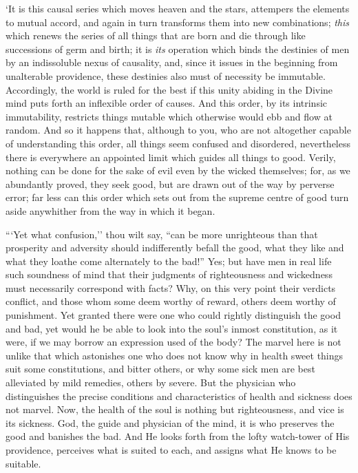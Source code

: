 \documentclass[11pt]{book}
\begin{document}
`It is this causal series which moves heaven and the stars, attempers
the elements to mutual accord, and again in turn transforms them into
new combinations; \emph{this} which renews the series of all things that are
born and die through like successions of germ and birth; it is \emph{its}
operation which binds the destinies of men by an indissoluble nexus of
causality, and, since it issues in the beginning from unalterable
providence, these destinies also must of necessity be immutable.
Accordingly, the world is ruled for the best if this unity abiding in
the Divine mind puts forth an inflexible order of causes. And this
order, by its intrinsic immutability, restricts things mutable which
otherwise would ebb and flow at random. And so it happens that, although
to you, who are not altogether capable of understanding this order, all
things seem confused and disordered, nevertheless there is everywhere an
appointed limit which guides all things to good. Verily, nothing can be
done for the sake of evil even by the wicked themselves; for, as we
abundantly proved, they seek good, but are drawn out of the way by
perverse error; far less can this order which sets out from the supreme
centre of good turn aside anywhither from the way in which it began.

```Yet what confusion,'' thou wilt say, ``can be more unrighteous than that
prosperity and adversity should indifferently befall the good, what
they like and what they loathe come alternately to the bad!'' Yes; but
have men in real life such soundness of mind that their judgments of
righteousness and wickedness must necessarily correspond with facts?
Why, on this very point their verdicts conflict, and those whom some
deem worthy of reward, others deem worthy of punishment. Yet granted
there were one who could rightly distinguish the good and bad, yet would
he be able to look into the soul's inmost constitution, as it were, if
we may borrow an expression used of the body? The marvel here is not
unlike that which astonishes one who does not know why in health sweet
things suit some constitutions, and bitter others, or why some sick men
are best alleviated by mild remedies, others by severe. But the
physician who distinguishes the precise conditions and characteristics
of health and sickness does not marvel. Now, the health of the soul is
nothing but righteousness, and vice is its sickness. God, the guide and
physician of the mind, it is who preserves the good and banishes the
bad. And He looks forth from the lofty watch-tower of His providence,
perceives what is suited to each, and assigns what He knows to be
suitable.
\end{document}
